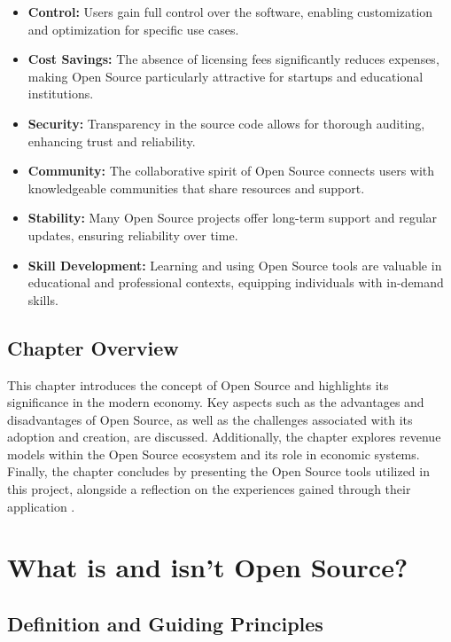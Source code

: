 \begin{itemize}
    \item \textbf{Control:} Users gain full control over the software, enabling customization and optimization for specific use cases.
    \item \textbf{Cost Savings:} The absence of licensing fees significantly reduces expenses, making Open Source particularly attractive for startups and educational institutions.
    \item \textbf{Security:} Transparency in the source code allows for thorough auditing, enhancing trust and reliability.
    \item \textbf{Community:} The collaborative spirit of Open Source connects users with knowledgeable communities that share resources and support.
    \item \textbf{Stability:} Many Open Source projects offer long-term support and regular updates, ensuring reliability over time.
    \item \textbf{Skill Development:} Learning and using Open Source tools are valuable in educational and professional contexts, equipping individuals with in-demand skills.
\end{itemize}


\subsection{Chapter Overview}

This chapter introduces the concept of Open Source and highlights its significance in the modern economy. 
Key aspects such as the advantages and disadvantages of Open Source, as well as the challenges associated with its adoption and creation, are discussed. 
Additionally, the chapter explores revenue models within the Open Source ecosystem and its role in economic systems. 
Finally, the chapter concludes by presenting the Open Source tools utilized in this project, alongside a reflection on the experiences gained through their application \cite{opensource_what_is}.

%
%


\section{What is and isn’t Open Source?}

\subsection{Definition and Guiding Principles}


